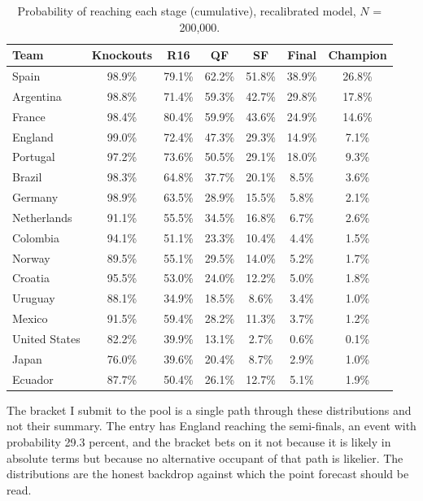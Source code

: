 \documentclass[11pt,a4paper]{article}
\begin{document}
\begin{table}[ht]
\centering\small
\caption{Probability of reaching each stage (cumulative), recalibrated model, $N$ = 200{,}000.}
\label{tab:survival}
\begin{tabular}{lcccccc}
\toprule
Team & Knockouts & R16 & QF & SF & Final & Champion \\
\midrule
Spain          & 98.9\% & 79.1\% & 62.2\% & 51.8\% & 38.9\% & 26.8\% \\
Argentina      & 98.8\% & 71.4\% & 59.3\% & 42.7\% & 29.8\% & 17.8\% \\
France         & 98.4\% & 80.4\% & 59.9\% & 43.6\% & 24.9\% & 14.6\% \\
England        & 99.0\% & 72.4\% & 47.3\% & 29.3\% & 14.9\% &  7.1\% \\
Portugal       & 97.2\% & 73.6\% & 50.5\% & 29.1\% & 18.0\% &  9.3\% \\
Brazil         & 98.3\% & 64.8\% & 37.7\% & 20.1\% &  8.5\% &  3.6\% \\
Germany        & 98.9\% & 63.5\% & 28.9\% & 15.5\% &  5.8\% &  2.1\% \\
Netherlands    & 91.1\% & 55.5\% & 34.5\% & 16.8\% &  6.7\% &  2.6\% \\
Colombia       & 94.1\% & 51.1\% & 23.3\% & 10.4\% &  4.4\% &  1.5\% \\
Norway         & 89.5\% & 55.1\% & 29.5\% & 14.0\% &  5.2\% &  1.7\% \\
Croatia        & 95.5\% & 53.0\% & 24.0\% & 12.2\% &  5.0\% &  1.8\% \\
Uruguay        & 88.1\% & 34.9\% & 18.5\% &  8.6\% &  3.4\% &  1.0\% \\
Mexico         & 91.5\% & 59.4\% & 28.2\% & 11.3\% &  3.7\% &  1.2\% \\
United States  & 82.2\% & 39.9\% & 13.1\% &  2.7\% &  0.6\% &  0.1\% \\
Japan          & 76.0\% & 39.6\% & 20.4\% &  8.7\% &  2.9\% &  1.0\% \\
Ecuador        & 87.7\% & 50.4\% & 26.1\% & 12.7\% &  5.1\% &  1.9\% \\
\bottomrule
\end{tabular}
\end{table}

The bracket I submit to the pool is a single path through these distributions and not their summary. The entry has England reaching the semi-finals, an event with probability 29.3 percent, and the bracket bets on it not because it is likely in absolute terms but because no alternative occupant of that path is likelier. The distributions are the honest backdrop against which the point forecast should be read.
\end{document}
